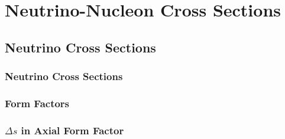 \section{Neutrino-Nucleon Cross Sections} \label{theory}
\hspace{\parindent}

\subsection{Neutrino Cross Sections}\label{probe}
  \subsubsection{Neutrino Cross Sections}
  \subsubsection{Form Factors}
  \subsubsection{$\Delta s$ in Axial Form Factor}

